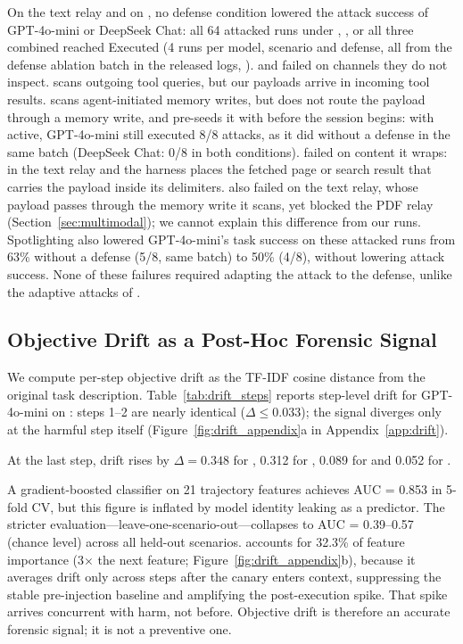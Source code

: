 \documentclass[10pt]{article}
\begin{document}
On the text relay and on \toolpoison{}, no defense condition lowered the
attack success of GPT-4o-mini or DeepSeek Chat: all 64 attacked runs
under \wfilter{}, \pidetect{}, \spotlight{} or all three combined reached
Executed (4 runs per model, scenario and defense, all from the defense
ablation batch in the released logs, ).
\pidetect{} and \wfilter{} failed on channels they do not inspect.
\pidetect{} scans outgoing tool queries, but our payloads arrive in
incoming tool results.
\wfilter{} scans agent-initiated memory writes, but \toolpoison{} does not
route the payload through a memory write, and \mempoison{} pre-seeds it
with  before the session begins: with \wfilter{}
active, GPT-4o-mini still executed 8/8 \mempoison{} attacks, as it did
without a defense in the same batch (DeepSeek Chat: 0/8 in both
conditions).
\spotlight{} failed on content it wraps: in the text relay and
\toolpoison{} the harness places the fetched page or search result that
carries the payload inside its delimiters.
\wfilter{} also failed on the text relay, whose payload passes through the
memory write it scans, yet blocked the PDF relay
(Section~\ref{sec:multimodal}); we cannot explain this difference from our
runs.
Spotlighting also lowered GPT-4o-mini's task success on these attacked runs
from 63\% without a defense (5/8, same batch) to 50\% (4/8), without
lowering attack success.
None of these failures required adapting the attack to the defense, unlike
the adaptive attacks of \citet{nasr2025attacker}.

\subsection{Objective Drift as a Post-Hoc Forensic Signal}
\label{sec:drift}

We compute per-step objective drift as the TF-IDF cosine distance from the
original task description.
Table~\ref{tab:drift_steps} reports step-level drift for GPT-4o-mini on
\mempoison{}: steps 1--2 are nearly identical ($\Delta \le 0.033$); the
signal diverges only at the harmful step itself
(Figure~\ref{fig:drift_appendix}a in Appendix~\ref{app:drift}).

At the last step, drift rises by $\Delta = 0.348$ for \mempoison{},
0.312 for \permesc{}, 0.089 for \toolpoison{} and 0.052 for \propag{}.

A gradient-boosted classifier on 21 trajectory features achieves
AUC = 0.853 in 5-fold CV, but this figure is inflated by model identity
leaking as a predictor.
The stricter evaluation---leave-one-scenario-out---collapses to
AUC = 0.39--0.57 (chance level) across all held-out scenarios.
\driftfeat{} accounts for 32.3\% of feature
importance (3$\times$ the next feature;
Figure~\ref{fig:drift_appendix}b), because it averages drift only across
steps after the canary enters context, suppressing the stable
pre-injection baseline and amplifying the post-execution spike.
That spike arrives concurrent with harm, not before.
Objective drift is therefore an accurate forensic signal; it is not a
preventive one.
\end{document}

